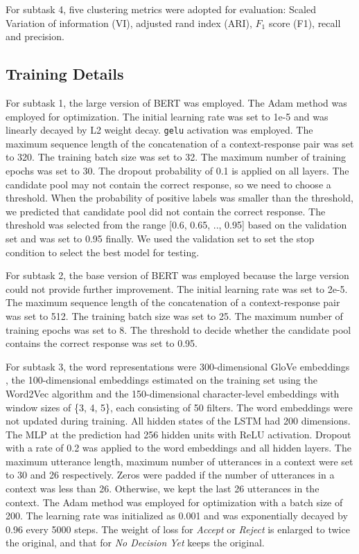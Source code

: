 \documentclass[letterpaper]{article} \usepackage{aaai20}  \usepackage{times}  \usepackage{helvet} \usepackage{courier}  \usepackage[hyphens]{url}  \usepackage{graphicx} \urlstyle{rm} \def\UrlFont{\rm}  \usepackage{graphicx}  \frenchspacing  \setlength{\pdfpagewidth}{8.5in}  \setlength{\pdfpageheight}{11in}
\begin{document}
    For subtask 4, five clustering metrics were adopted for evaluation: Scaled Variation of information (VI), adjusted rand index (ARI), $F_{1}$ score (F1), recall and precision.

  \subsection{Training Details}

    For subtask 1, the large version of BERT was employed.
    The Adam method \cite{DBLP:journals/corr/KingmaB14} was employed for optimization.
    The initial learning rate was set to 1e-5 and was linearly decayed by L2 weight decay.
    \texttt{gelu} activation \cite{DBLP:journals/corr/HendrycksG16} was employed.
    The maximum sequence length of the concatenation of a context-response pair was set to 320.
    The training batch size was set to 32.
    The maximum number of training epochs was set to 30.
    The dropout \cite{DBLP:journals/jmlr/SrivastavaHKSS14} probability of 0.1 is applied on all layers.
    The candidate pool may not contain the correct response, so we need to choose a threshold.
    When the probability of positive labels was smaller than the threshold, we predicted that candidate pool did not contain the correct response.
    The threshold was selected from the range [0.6, 0.65, .., 0.95] based on the validation set and was set to 0.95 finally.
    We used the validation set to set the stop condition to select the best model for testing.

    For subtask 2, the base version of BERT was employed because the large version could not provide further improvement.
    The initial learning rate was set to 2e-5.
    The maximum sequence length of the concatenation of a context-response pair was set to 512.
    The training batch size was set to 25.
    The maximum number of training epochs was set to 8.
    The threshold to decide whether the candidate pool contains the correct response was set to 0.95.

    For subtask 3, the word representations were 300-dimensional GloVe embeddings \cite{DBLP:conf/emnlp/PenningtonSM14}, the 100-dimensional embeddings estimated on the training set using the Word2Vec algorithm \cite{DBLP:conf/nips/MikolovSCCD13} and the 150-dimensional character-level embeddings with window sizes of \{3, 4,  5\}, each consisting of 50 filters.
    The word embeddings were not updated during training.
    All hidden states of the LSTM had 200 dimensions.
    The MLP at the prediction had 256 hidden units with ReLU \cite{DBLP:conf/icml/NairH10} activation.
    Dropout with a rate of 0.2 was applied to the word embeddings and all hidden layers.
    The maximum utterance length, maximum number of utterances in a context were set to 30 and 26 respectively.
    Zeros were padded if the number of utterances in a context was less than 26.
    Otherwise, we kept the last 26 utterances in the context.
    The Adam method was employed for optimization with a batch size of 200.
    The learning rate was initialized as 0.001 and was exponentially decayed by 0.96 every 5000 steps.
    The weight of loss for \emph{Accept} or \emph{Reject} is enlarged to twice the original, and that for \emph{No Decision Yet} keeps the original.
\end{document}
